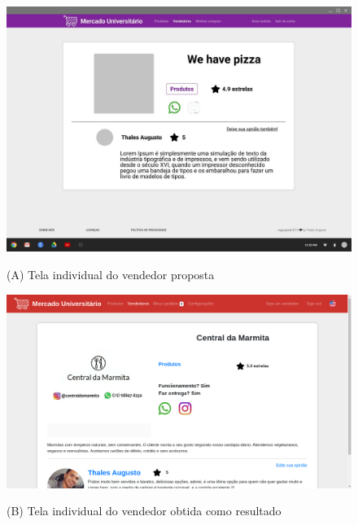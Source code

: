 \begin{figure}[htbp!]
  \centering
  \caption{(A) Tela individual do vendedor proposta}
  \includegraphics[width=1\textwidth]{figs/mockup/vendedor.jpg}
    \label{fig:mockup_vendedor}
\end{figure}

\begin{figure}[htbp!]
  \centering
  \caption{(B) Tela individual do vendedor obtida como resultado}
  \includegraphics[width=1\textwidth]{figs/resultado/vendedor.png}
    \label{fig:real_vendedor}
\end{figure}

